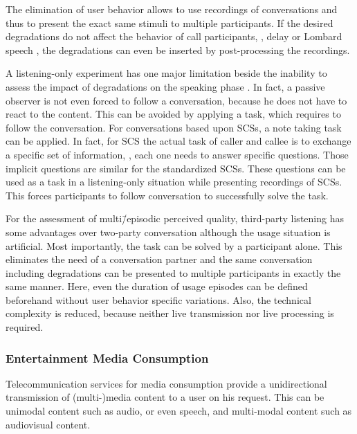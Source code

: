 The elimination of user behavior allows to use recordings of conversations and thus to present the exact same stimuli to multiple participants.
If the desired degradations do not affect the behavior of call participants, \eg, delay or Lombard speech \citep[][p.~161]{moller_assessment_2000}, the degradations can even be inserted by post-processing the recordings.

A listening-only experiment has one major limitation beside the inability to assess the impact of degradations on the speaking phase \citep{gueguin_evaluation_2008}.
In fact, a passive observer is not even forced to follow a conversation, because he does not have to react to the content.
This can be avoided by applying a task, which requires to follow the conversation.
For conversations based upon \acp{SCS}, a note taking task can be applied.
In fact, for \ac{SCS} the actual task of caller and callee is to exchange a specific set of information, \ie, each one needs to answer specific questions.
Those implicit questions are similar for the standardized \acp{SCS}.
These questions can be used as a task in a listening-only situation while presenting recordings of \acp{SCS}.
This forces participants to follow conversation to successfully solve the task.

For the assessment of multi\=/episodic perceived quality, third-party listening has some advantages over two-party conversation although the usage situation is artificial.
Most importantly, the task can be solved by a participant alone.
This eliminates the need of a conversation partner and the same conversation including degradations can be presented to multiple participants in exactly the same manner.
Here, even the duration of usage episodes can be defined beforehand without user behavior specific variations.
Also, the technical complexity is reduced, because neither live transmission nor live processing is required.

\subsubsection*{Entertainment Media Consumption}
Telecommunication services for media consumption provide a unidirectional transmission of (multi-)media content to a user on his request.
This can be unimodal content such as audio, or even speech, and multi-modal content such as audiovisual content.

